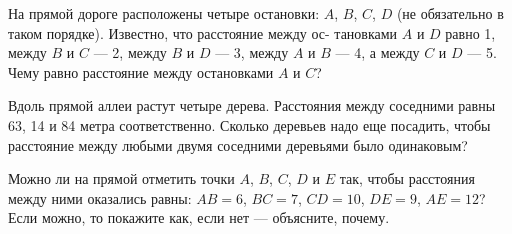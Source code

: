 ﻿
\begin{itemize}
\def\inkm#1{\SI{#1}{\text{км}}}

\itA На прямой дороге расположены четыре остановки: $A$, $B$, $C$, $D$ (не обязательно в таком порядке). Известно, что расстояние между ос- тановками $A$ и $D$ равно \inkm{1}, между $B$ и $C$ — \inkm{2}, между $B$ и $D$ — \inkm{3}, между $A$ и $B$ — \inkm{4}, а между $C$ и $D$ — \inkm{5}. Чему равно расстояние между остановками $A$ и $C$?

\itB Вдоль прямой аллеи растут четыре дерева. Расстояния между соседними равны 63, 14 и 84 метра соответственно. Сколько деревьев надо еще посадить, чтобы расстояние между любыми двумя соседними деревьями было одинаковым?

\itC Можно ли на прямой отметить точки $A$, $B$, $C$, $D$ и $E$ так, чтобы расстояния между ними оказались равны: $AB=6$, $BC=7$, $CD=10$, $DE=9$, $AE=12$? Если можно, то покажите как, если нет — объясните, почему.
\end{itemize}